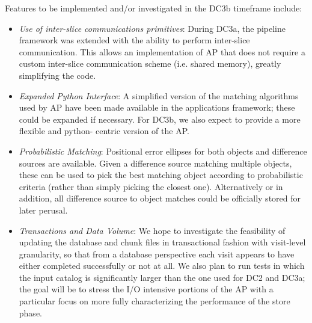 Features to be implemented and/or investigated in the DC3b timeframe include:
\begin{itemize}
\item \emph{Use of inter-slice communications primitives}:
    During DC3a, the pipeline framework was extended with the ability to
    perform inter-slice communication. This allows an implementation of AP
    that does not require a custom inter-slice communication scheme (i.e.
    shared memory), greatly simplifying the code.
\item \emph{Expanded Python Interface}:
    A simplified version of the matching algorithms used by AP have been made
    available in the applications framework; these could be expanded if
    necessary. For DC3b, we also expect to provide a more flexible and python-
    centric version of the AP.
\item \emph{Probabilistic Matching}:
    Positional error ellipses for both objects and difference sources are
    available. Given a difference source matching multiple objects, these
    can be used to pick the best matching object according to probabilistic
    criteria (rather than simply picking the closest one). Alternatively
    or in addition, all difference source to object matches could be
    officially stored for later perusal.
\item \emph{Transactions and Data Volume}:
    We hope to investigate the feasibility of updating the database and chunk
    files in transactional fashion with visit-level granularity, so that from
    a database perspective each visit appears to have either completed
    successfully or not at all. We also plan to run tests in which the input
     catalog is significantly larger than the one used for DC2
    and DC3a; the goal will be to stress the I/O intensive portions of the AP
    with a particular focus on more fully characterizing the performance of
    the store phase.
\end{itemize}

